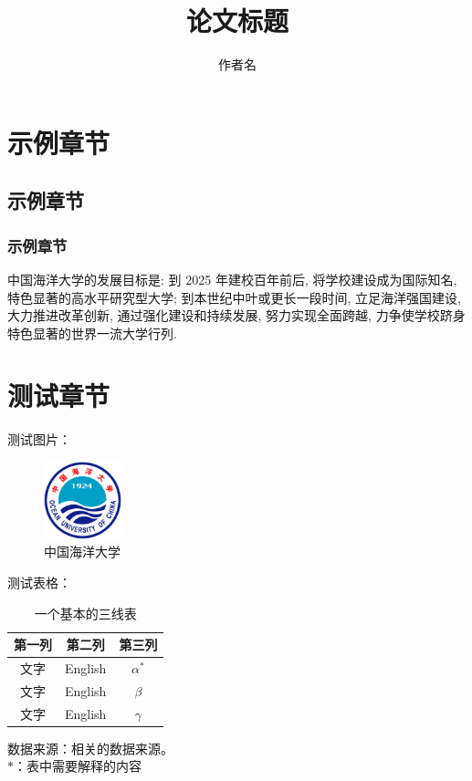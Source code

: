 \documentclass[zihao = -4,cn]{oucart}
\title{论文标题}
\author{作者名}
\begin{document}
\makecover

\makesignature

\makeabstract

\thispagestyle{tableofcontents}  
\tableofcontents

\newpage
{}
\setcounter{page}{1} 
\section{示例章节}
\subsection{示例章节}
\subsubsection{示例章节}
中国海洋大学的发展目标是: 到 2025 年建校百年前后, 将学校建设成为国际知名, 特色显著的高水平研究型大学; 到本世纪中叶或更长一段时间, 立足海洋强国建设, 大力推进改革创新, 通过强化建设和持续发展, 努力实现全面跨越, 力争使学校跻身特色显著的世界一流大学行列\cite{wiki:ouc}. 
\section{测试章节}
测试图片：
\begin{figure}[!htbp]
    \centering
    \includegraphics[width = 0.2\textwidth]{assets/logo}
    \caption{中国海洋大学}
    \label{fig:ouc1}
\end{figure}

测试表格：
\begin{table}[!htbp]
\centering
\caption{一个基本的三线表}
\begin{minipage}[t]{350pt}
\begin{tabular*}{350pt}{@{\extracolsep{\fill}}ccc}
\toprule
第一列 & 第二列 & 第三列 \\
\midrule
文字 & English & $\alpha^*$ \\
文字 & English & $\beta$ \\
文字 & English & $\gamma$\\
\bottomrule
\end{tabular*}
\footnotesize
数据来源：相关的数据来源。 \\
$*$：表中需要解释的内容
\end{minipage}
\end{table}
\end{document}
